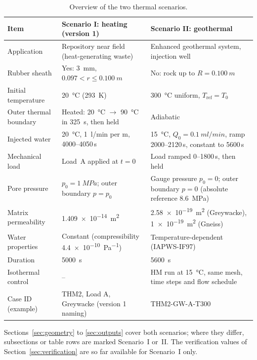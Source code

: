 \documentclass[11pt,a4paper]{article}
\begin{document}
\begin{table}[htbp]
\centering
\caption{Overview of the two thermal scenarios.}
\label{tab:scenarios}
\small
\begin{tabularx}{\textwidth}{@{}lLL@{}}
\toprule
Item & Scenario I: heating (version 1) & Scenario II: geothermal \\
\midrule
Application        & Repository near field (heat-generating waste) & Enhanced geothermal system, injection well \\
Rubber sheath      & Yes: \SI{3}{mm}, $0.097 < r \le \SI{0.100}{m}$ & No: rock up to $R=\SI{0.100}{m}$ \\
Initial temperature & \SI{20}{\celsius} (\SI{293}{K}) & \SI{300}{\celsius} uniform, $T_\mathrm{ref}=T_0$ \\
Outer thermal boundary & Heated: \SI{20}{\celsius} $\rightarrow$ \SI{90}{\celsius} in \SI{325}{s}, then held & Adiabatic \\
Injected water     & \SI{20}{\celsius}, \SI{1}{l/min} per m, 4000--4050\,s & \SI{15}{\celsius}, $Q_0=\SI{0.1}{ml/min}$, ramp 2000--2120\,s, constant to 5600\,s \\
Mechanical load    & Load~A applied at $t=0$ & Load ramped 0--1800\,s, then held \\
Pore pressure      & $p_0=\SI{1}{MPa}$; outer boundary $p=p_0$ & Gauge pressure $p_0=0$; outer boundary $p=0$ (absolute reference \SI{8.6}{MPa}) \\
Matrix permeability & \SI{1.409e-14}{m^2} & \SI{2.58e-19}{m^2} (Greywacke), \SI{1e-19}{m^2} (Gneiss) \\
Water properties   & Constant (compressibility \SI{4.4e-10}{Pa^{-1}}) & Temperature-dependent (IAPWS-IF97) \\
Duration           & \SI{5000}{s} & \SI{5600}{s} \\
Isothermal control & -- & HM run at \SI{15}{\celsius}, same mesh, time steps and flow schedule \\
Case ID (example)  & THM2, Load A, Greywacke (version 1 naming) & THM2-GW-A-T300~\cite{Pan2026} \\
\bottomrule
\end{tabularx}
\end{table}

Sections~\ref{sec:geometry} to \ref{sec:outputs} cover both scenarios; where
they differ, subsections or table rows are marked Scenario~I or~II. The
verification values of Section~\ref{sec:verification} are so far available for
Scenario~I only.

\end{document}
